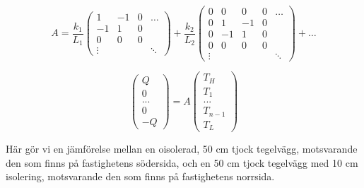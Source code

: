\begin{equation}
\label{eq:staticwallmethod:example}
A = \frac{k_1}{L_1}
\begin{pmatrix}
1 & -1 & 0 &  \dots \\
-1 & 1 & 0 &   \\
0 & 0 & 0 &  \\
\vdots & & & \ddots
\end{pmatrix}
+
\frac{k_2}{L_2}
\begin{pmatrix}
0 & 0 & 0 & 0 & \dots \\
0 & 1 & -1 & 0 &  \\
0 & -1 & 1 & 0 & \\
0 & 0 & 0 & 0 & \\
\vdots & & & & \ddots
\end{pmatrix} + \dots
\end{equation}

\begin{equation}
\label{eq:staticwallmethod:full}
\begin{pmatrix}
Q\\0\\...\\0\\-Q
\end{pmatrix} = A
\begin{pmatrix}
T_H\\T_1\\...\\T_{n-1}\\T_L
\end{pmatrix}
\end{equation}

Här gör vi en jämförelse mellan en oisolerad, 50 cm tjock tegelvägg, motsvarande den som finns på fastighetens södersida, och en 50 cm tjock tegelvägg med 10 cm isolering, motsvarande den som finns på fastighetens norrsida.


